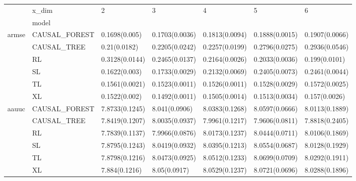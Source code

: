 \begin{tabular}{lllllll}
\toprule
      & x\_dim &               2 &               3 &               4 &               5 &               6 \\
{} & model &                 &                 &                 &                 &                 \\
\midrule
armse & CAUSAL\_FOREST &   0.1698(0.005) &  0.1703(0.0036) &  0.1813(0.0094) &  0.1888(0.0015) &  0.1907(0.0066) \\
      & CAUSAL\_TREE &    0.21(0.0182) &  0.2205(0.0242) &  0.2257(0.0199) &  0.2796(0.0275) &  0.2936(0.0546) \\
      & RL &  0.3128(0.0144) &  0.2465(0.0137) &  0.2164(0.0026) &  0.2033(0.0036) &   0.199(0.0101) \\
      & SL &   0.1622(0.003) &  0.1733(0.0029) &  0.2132(0.0069) &  0.2405(0.0073) &  0.2461(0.0044) \\
      & TL &  0.1561(0.0021) &  0.1523(0.0011) &  0.1526(0.0011) &  0.1528(0.0029) &  0.1572(0.0025) \\
      & XL &   0.1522(0.002) &  0.1492(0.0011) &  0.1505(0.0014) &  0.1513(0.0034) &   0.157(0.0026) \\
aauuc & CAUSAL\_FOREST &  7.8733(0.1245) &   8.041(0.0906) &  8.0383(0.1268) &  8.0597(0.0666) &  8.0113(0.1889) \\
      & CAUSAL\_TREE &  7.8419(0.1207) &  8.0035(0.0937) &  7.9961(0.1217) &  7.9606(0.0811) &  7.8818(0.2405) \\
      & RL &  7.7839(0.1137) &  7.9966(0.0876) &  8.0173(0.1237) &  8.0444(0.0711) &  8.0106(0.1869) \\
      & SL &  7.8795(0.1243) &  8.0419(0.0932) &  8.0395(0.1213) &  8.0554(0.0687) &  8.0128(0.1929) \\
      & TL &  7.8798(0.1216) &  8.0473(0.0925) &  8.0512(0.1233) &  8.0699(0.0709) &  8.0292(0.1911) \\
      & XL &   7.884(0.1216) &    8.05(0.0917) &  8.0529(0.1237) &  8.0721(0.0696) &  8.0288(0.1896) \\
\bottomrule
\end{tabular}
